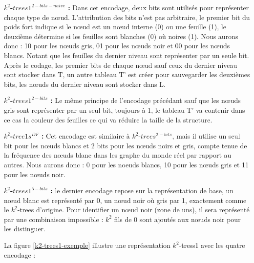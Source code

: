 \textbf{ $k^2$-$trees1^{2-bits-naive}$ :} Dans cet encodage, deux bits sont utilisés pour représenter chaque type de nœud. L'attribution des bits n'est pas arbitraire, le premier bit du poids fort indique si le nœud est un nœud interne (0) ou une feuille (1), le deuxième détermine si les feuilles sont blanches (0) où noires (1). Nous aurons donc : 10 pour les nœuds gris, 01 pour les nœuds noir et 00 pour les nœuds blancs. Notant que les feuilles du dernier niveau sont représenter par un seule bit.
Après le codage, les premier bits de chaque nœud sauf ceux du dernier niveau sont stocker dans T, un autre tableau T' est créer pour sauvegarder les deuxièmes bits, les nœuds du dernier niveau sont stocker dans L.

\textbf{ $k^2$-$trees1^{2-bits}$ :} Le même principe de l'encodage précédant sauf que les nœuds gris sont représenter par un seul bit, toujours à 1, le tableau T' va contenir dans ce cas la couleur des feuilles ce qui va réduire la taille de la structure.

\textbf{ $k^2$-$tree1s^{DF}$ :} Cet encodage est similaire à $k^2$-$trees^{2-bits}$, mais il utilise un seul bit pour les nœuds blancs et 2 bits pour les nœuds noirs et gris, compte tenue de la fréquence des nœuds blanc dans les graphe du monde réel par rapport au autres. Nous aurons donc : 0 pour les noeuds blancs, 10 pour les nœuds gris et 11 pour les nœuds noir.

\textbf{ $k^2$-$trees1^{5-bits}$ :} le dernier encodage repose sur la représentation de base, un nœud blanc est représenté par 0, un nœud noir où gris par 1, exactement comme le $k^2$-trees d'origine. Pour identifier un nœud noir (zone de uns), il sera représenté par une combinaison impossible : $k^2$ fils de 0 sont ajoutés aux nœuds noir pour les distinguer.


La figure \ref{k2-trees1-exemple} illustre une représentation $k^2$-tress1 avec les quatre encodage \citep{de2014new} : 



